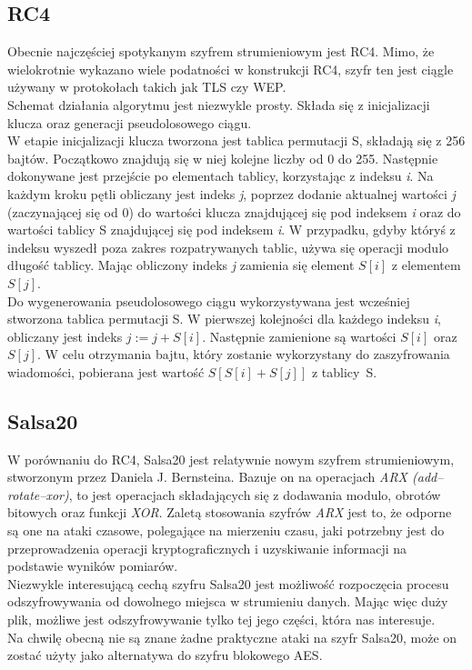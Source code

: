 \subsection{RC4}
Obecnie najczęściej spotykanym szyfrem strumieniowym jest RC4. Mimo, że wielokrotnie wykazano wiele podatności w konstrukcji RC4, szyfr ten jest ciągle używany w protokołach takich jak TLS czy WEP. \\
Schemat działania algorytmu jest niezwykle prosty. 
Składa się z inicjalizacji klucza oraz generacji pseudolosowego ciągu. \\
W etapie inicjalizacji klucza tworzona jest tablica permutacji S, składają się z 256 bajtów. 
Początkowo znajdują się w niej kolejne liczby od 0 do 255. 
Następnie dokonywane jest przejście po elementach tablicy, korzystając z indeksu \textit{i}. Na każdym kroku pętli obliczany jest indeks \textit{j}, poprzez dodanie aktualnej wartości \textit{j} (zaczynającej się od 0) do wartości klucza znajdującej się pod indeksem \textit{i} oraz do wartości tablicy S znajdującej się pod indeksem \textit{i}. W przypadku, gdyby któryś z indeksu wyszedł poza zakres rozpatrywanych tablic, używa się operacji modulo długość tablicy. Mając obliczony indeks \textit{j} zamienia się element $S[i]$ z elementem $S[j]$. \\
Do wygenerowania pseudolosowego ciągu wykorzystywana jest wcześniej stworzona tablica permutacji S. W pierwszej kolejności dla każdego indeksu \textit{i}, obliczany jest indeks $j := j + S[i]$. 
Następnie zamienione są wartości $S[i]$ oraz $S[j]$. W celu otrzymania bajtu, który zostanie wykorzystany do zaszyfrowania wiadomości, pobierana jest wartość $S[S[i] + S[j]]$ z tablicy~S.

\subsection{Salsa20}
W porównaniu do RC4, Salsa20 jest relatywnie nowym szyfrem strumieniowym, stworzonym przez Daniela J. Bernsteina. 
Bazuje on na operacjach \textit{ARX (add–rotate–xor)}, to jest operacjach składających się z dodawania modulo, obrotów bitowych oraz funkcji \textit{XOR}. 
Zaletą stosowania szyfrów \textit{ARX} jest to, że odporne są one na ataki czasowe, 
polegające na mierzeniu czasu, jaki potrzebny jest do przeprowadzenia operacji kryptograficznych i uzyskiwanie informacji na podstawie wyników pomiarów. \\
Niezwykle interesującą cechą szyfru Salsa20 jest możliwość rozpoczęcia procesu odszyfrowywania od dowolnego miejsca w strumieniu danych. Mając więc duży plik, możliwe jest odszyfrowywanie tylko tej jego części, która nas interesuje. \\
Na chwilę obecną nie są znane żadne praktyczne ataki na szyfr Salsa20, może on zostać użyty jako alternatywa do szyfru blokowego AES.

